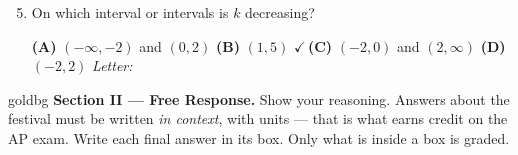 \documentclass[10pt]{article}
\begin{document}
\begin{enumerate}[leftmargin=1.9em, itemsep=8pt]
\setcounter{enumi}{4}
\item On which interval or intervals is $k$ decreasing?

      \smallskip
      \textbf{(A)} $(-\infty, -2)$ and $(0, 2)$ \hspace{1.2em} \textbf{(B)} $(1, 5)$ \hspace{1.2em}
      {\color{keyred}\textbf{$\checkmark$\,(C)}} $(-2, 0)$ and $(2, \infty)$ \hspace{1.2em} \textbf{(D)} $(-2, 2)$ \hfill\textit{Letter:}~\gradedblank[id=ap5, type=choice, points=1, answer=C]{0.42in}{13pt}

\end{enumerate}

\newpage

\begin{headlinebox}{goldbg}
\small
\textbf{Section II --- Free Response.} Show your reasoning. Answers about the festival must be
written \emph{in context}, with units --- that is what earns credit on the AP exam. Write each final answer in its box. Only what is inside a box is graded.
\end{headlinebox}

\vspace{0.08in}
\end{document}
